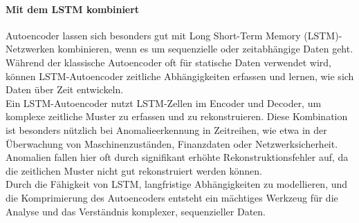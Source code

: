 \documentclass[a4paper,12pt]{article}
\begin{document}
	\paragraph{Mit dem LSTM kombiniert}
	Autoencoder lassen sich besonders gut mit Long Short-Term Memory (LSTM)-Netzwerken kombinieren, wenn es um sequenzielle oder zeitabhängige Daten geht. Während der klassische Autoencoder oft für statische Daten verwendet wird, können LSTM-Autoencoder zeitliche Abhängigkeiten erfassen und lernen, wie sich Daten über Zeit entwickeln.
	\\[0.5em]
	Ein LSTM-Autoencoder nutzt LSTM-Zellen im Encoder und Decoder, um komplexe zeitliche Muster zu erfassen und zu rekonstruieren. Diese Kombination ist besonders nützlich bei Anomalieerkennung in Zeitreihen, wie etwa in der Überwachung von Maschinenzuständen, Finanzdaten oder Netzwerksicherheit. Anomalien fallen hier oft durch signifikant erhöhte Rekonstruktionsfehler auf, da die zeitlichen Muster nicht gut rekonstruiert werden können.
	\\[0.5em]
	Durch die Fähigkeit von LSTM, langfristige Abhängigkeiten zu modellieren, und die Komprimierung des Autoencoders entsteht ein mächtiges Werkzeug für die Analyse und das Verständnis komplexer, sequenzieller Daten.
	
\end{document}
